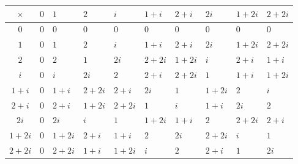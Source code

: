 \documentclass[12pt,a4paper]{article}
\begin{document}
    \begin{center}
    	{\footnotesize
    	\begin{xltabular}{\textwidth}{|c|X|X|X|X|X|X|X|X|X|}
    		\hline
    		$\times$ & $0$ & $1$ & $2$ & $i$ & $1+i$ & $2+i$ & $2i$ & $1+2i$ & $2+2i$\\
    		\hline
    		$0$ & $0$ & $0$ & $0$ & $0$ & $0$ & $0$ & $0$ & $0$ & $0$\\
    		\hline
    		$1$ & $0$ & $1$ & $2$ & $i$ & $1+i$ & $2+i$ & $2i$ & $1+2i$ & $2+2i$\\
    		\hline
    		$2$ & $0$ & $2$ & $1$ & $2i$ & $2+2i$ & $1+2i$ & $i$ & $2+i$ & $1+i$\\
    		\hline
    		$i$ & $0$ & $i$ & $2i$ & $2$ & $2+i$ & $2+2i$ & $1$ & $1+i$ & $1+2i$\\
    		\hline
    		$1+i$ & $0$ & $1+i$ & $2+2i$ & $2+i$ & $2i$ & $1$ & $1+2i$ & $2$ & $i$\\
    		\hline
    		$2+i$ & $0$ & $2+i$ & $1+2i$ & $2+2i$ & $1$ & $i$ & $1+i$ & $2i$ & $2$\\
    		\hline
    		$2i$ & $0$ & $2i$ & $i$ & $1$ & $1+2i$ & $1+i$ & $2$ & $2+2i$ & $2+i$\\
    		\hline
    		$1+2i$ & $0$ & $1+2i$ & $2+i$ & $1+i$ & $2$ & $2i$ & $2+2i$ & $i$ & $1$\\
    		\hline
    		$2+2i$ & $0$ & $2+2i$ & $1+i$ & $1+2i$ & $i$ & $2$ & $2+i$ & $1$ & $2i$\\
    		\hline
    	\end{xltabular}
    	}
    \end{center}
\end{document}
